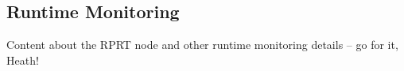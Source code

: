 \subsection{Runtime Monitoring}

Content about the RPRT node and other runtime monitoring details -- go for it, Heath!
